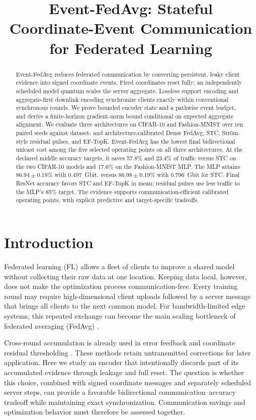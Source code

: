 \documentclass[conference]{IEEEtran}
\title{Event-FedAvg: Stateful Coordinate-Event Communication for Federated Learning}
\author{\IEEEauthorblockN{Anonymous Authors}}
\newcommand{\mOneColor}{}
\newcommand{\mOneRev}[1]{{\mOneColor #1}}
\newcommand{\mlpColor}{\color{mlporange}}
\newcommand{\mlpRev}[1]{{\mlpColor #1}}
\begin{document}
\maketitle

\begin{abstract}
\mlpRev{Event-FedAvg reduces federated communication by converting persistent,
leaky client evidence into signed coordinate events. Fired coordinates reset
fully; an independently scheduled model quantum scales the server aggregate.
Lossless support encoding and aggregate-first downlink encoding synchronize
clients exactly within conventional synchronous rounds. We prove bounded
encoder state and a pathwise event budget, and derive a finite-horizon
gradient-norm bound conditional on expected aggregate alignment. We evaluate
three architectures on CIFAR-10 and Fashion-MNIST over ten paired seeds against
dataset- and architecture-calibrated Dense FedAvg, STC, Str\"om-style residual
pulses, and EF-TopK. Event-FedAvg has the lowest final bidirectional unicast
cost among the five selected operating points on all three architectures.
At the declared middle accuracy targets, it saves 57.8\% and 23.4\% of traffic
versus STC on the two CIFAR-10 models and 17.6\% on the Fashion-MNIST MLP.
The MLP attains $86.94\pm0.18\%$ with 0.497~Gbit, versus
$86.98\pm0.19\%$ with 0.796~Gbit for STC. Final ResNet accuracy favors STC
and EF-TopK in mean; residual pulses use less traffic to the MLP's 85\% target.
The evidence supports communication-efficient calibrated operating points,
with explicit predictive and target-specific tradeoffs.}
\end{abstract}

\section{Introduction}
\label{sec:introduction}

Federated learning (FL) allows a fleet of clients to improve a shared model
without collecting their raw data at one location. Keeping data local,
however, does not make the optimization process communication-free. Every
training round may require high-dimensional client uploads followed by a server
message that brings all clients to the next common model. For bandwidth-limited
edge systems, this repeated exchange can become the main scaling bottleneck of
federated averaging (FedAvg) \cite{mcmahan2017fedavg}.

\mOneRev{Cross-round accumulation is already used in error feedback and
coordinate residual thresholding
\cite{stich2018memory,richtarik2021ef21,strom2015distributed}.
These methods retain untransmitted corrections for later application.
Here we study an encoder that intentionally discards part of its accumulated
evidence through leakage and full reset. The question is whether this choice,
combined with signed coordinate messages and separately scheduled server steps,
can provide a favorable bidirectional communication--accuracy tradeoff while
maintaining exact synchronization. Communication savings and optimization
behavior must therefore be assessed together.}
\end{document}
